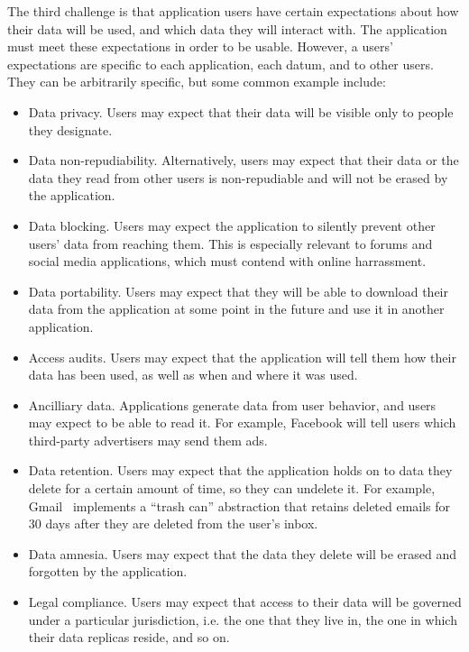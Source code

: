 The third challenge is that application users have
certain expectations about how their data will be used, and which data
they will interact with.  The application must
meet these expectations in order to be usable.  However, a users' expectations are
specific to each application, each datum, and to other users.  They can be
arbitrarily specific, but some common example include:

\begin{itemize}
   \item Data privacy.  Users may expect that their data will be visible only to
      people they designate.
   \item Data non-repudiability.  Alternatively, users may expect that their
      data or the data they read from other users is non-repudiable and will not
      be erased by the application.
   \item Data blocking.  Users may expect the application to silently prevent
      other users' data from reaching them.  This is especially relevant to
      forums and social media applications, which must contend with online
      harrassment.
   \item Data portability.  Users may expect that they will be able to download
      their data from the application at some point in the future and use it in
      another application.
   \item Access audits.  Users may expect that the application will tell them
      how their data has been used, as well as when and where it was used.
   \item Ancilliary data.  Applications generate data from user behavior, and
      users may expect to be able to read it.  For example, Facebook will tell
      users which third-party advertisers may send them ads.
   \item Data retention.  Users may expect that the application holds on to data
      they delete for a certain amount of time, so they can undelete it.  For
      example, Gmail~\cite{gmail} implements a ``trash can'' abstraction that retains
      deleted emails for 30 days after they are deleted from the user's inbox.
   \item Data amnesia.  Users may expect that the data they delete will be
      erased and forgotten by the application.
   \item Legal compliance.  Users may expect that access to their data will be
      governed under a particular jurisdiction, i.e. the one that they live in,
      the one in which their data replicas reside, and so on.
\end{itemize}

